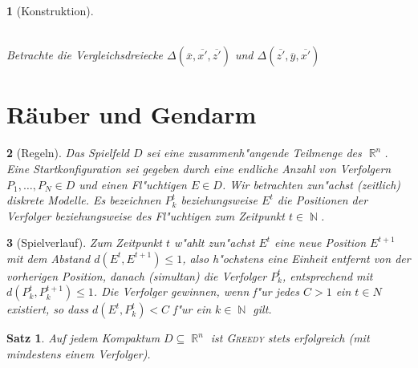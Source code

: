 \documentclass[paper=A4, twoside, chapterprefix=true, bibliography=totoc, headsepline]{scrbook}
\DeclareMathOperator{\N}{\mathbb{N}}
\DeclareMathOperator{\R}{\mathbb{R}}
\newcommand{\kapit}[1]{\textsc{#1}\xspace} %
\newcommand{\Greedy}{\kapit{Greedy}}
\theoremstyle{break}
\theoremstyle{nonumberbreak}
\newtheorem{satz}{Satz}
\theoremstyle{emptybreak}
\newtheorem{emptythm}{}%
\theoremstyle{break}
\newcommand{\quot}[1]{\textrm{\glqq}{#1}\textrm{\grqq}}
\begin{document}
\begin{emptythm}[Konstruktion]
\begin{center}
\\
Betrachte die Vergleichsdreiecke $\Delta(\overline x, \overline{x'}, \overline{z'})$ und $\Delta(\overline{z'}, \overline{y}, \overline{x'})$
\end{center}
\end{emptythm}

\section{R\"auber und Gendarm}

\begin{emptythm}[Regeln]
Das Spielfeld $D$ sei eine zusammenh"angende Teilmenge des $\R^n$.
Eine Startkonfiguration sei gegeben durch eine endliche Anzahl von Verfolgern $P_1, \ldots, P_N \in D$ und einen Fl"uchtigen $E \in D$.
Wir betrachten zun"achst (zeitlich) diskrete Modelle.
Es bezeichnen $P_k^t$ beziehungsweise $E^t$ die Positionen der Verfolger beziehungsweise des Fl"uchtigen zum Zeitpunkt $t \in \N$.
\end{emptythm}

\begin{emptythm}[Spielverlauf]
Zum Zeitpunkt $t$ w"ahlt zun"achst $E^t$ eine neue Position $E^{t+1}$ mit dem Abstand $d(E^t, E^{t+1}) \le 1$, also h"ochstens eine Einheit entfernt von der vorherigen Position, danach (simultan) die Verfolger $P_k^t$, entsprechend mit $d(P_k^t, P_k^{t+1}) \le 1$.
Die Verfolger gewinnen, wenn f"ur jedes $C > 1$ ein $t \in N$ existiert, so dass $d(E^t, P_k^t) < C$ f"ur ein $k \in \N$ gilt.
\end{emptythm}

\begin{satz}
Auf jedem Kompaktum $D \subseteq \R^n$ ist \quot{\index{Greedy@\Greedy}\Greedy} stets erfolgreich (mit mindestens einem Verfolger).
\end{satz}
\end{document}
